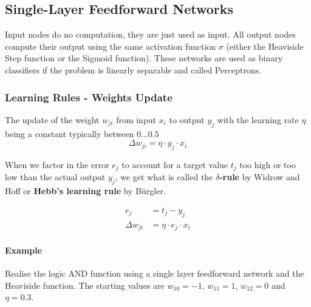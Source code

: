 \documentclass[11pt]{article}
\begin{document}
\subsection{Single-Layer Feedforward Networks}
Input nodes do no computation, they are just used as input. All output nodes compute their output using the same activation function $\sigma$ (either the Heaviside Step function or the Sigmoid function). These networks are used as binary classifiers if the problem is linearly separable and called Perceptrons.

\subsubsection{Learning Rules - Weights Update}

The update of the weight $w_{ji}$ from input $x_i$ to output $y_j$ with the learning rate $\eta$ being a constant typically between $0 ... 0.5$
\begin{equation}
    \Delta w_{ji} = \eta\cdot y_j \cdot x_i
\end{equation}

When we factor in the error $e_j$ to account for a target value $t_j$ too high or too low than the actual output $y_j$, we get what is called the \textbf{$\delta$-rule} by Widrow and Hoff or \textbf{Hebb's learning rule} by Bürgler.

\begin{align}\label{eq:widrowhoffrule}
    e_j &= t_j - y_j\\
    \Delta w_{ji} &= \eta\cdot e_j \cdot x_i
\end{align}

\paragraph{Example} Realise the logic AND function using a single layer feedforward network and the Heaviside function. The starting values are $w_{10}=-1$, $w_{11}=1$, $w_{12}=0$ and $\eta=0.3$.
\end{document}
